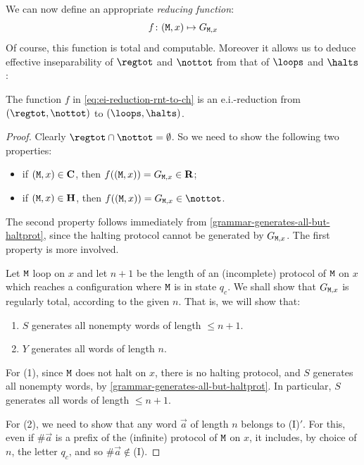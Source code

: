 \documentclass[runningheads]{amsart}
\newcommand{\TM}{\text{\rm\tt M}}
\begin{document}
We can now define an appropriate \emph{reducing function}:
\begin{equation}
\label{eq:ei-reduction-rnt-to-ch}
    f \colon (\TM,x) \mapsto G_{\TM,x}
\end{equation}
Of course, this function is total and computable.
Moreover it allows us to deduce effective inseparability of $\regtot $ and $\nottot$ from that of $\loops$ and $\halts$:



\begin{proposition}
\label{regtot-nottot-reduces-to-loops-halts}
    The function $f$ in \eqref{eq:ei-reduction-rnt-to-ch} is an e.i.-reduction from $(\regtot, \nottot)$ to $(\loops,\halts)$.
\end{proposition}
\begin{proof}
Clearly $\regtot \cap \nottot = \emptyset$. 
So we need to show the following two properties:
\begin{itemize}
\item if $(\TM,x) \in \mathbf{C}$, then $f((\TM,x)) = G_{\TM,x} \in \mathbf{R}$;
\item if $(\TM,x) \in \mathbf{H}$, then $f((\TM,x)) = G_{\TM,x} \in \nottot$.
\end{itemize}

The second property follows immediately from \cref{grammar-generates-all-but-haltprot}, since the halting protocol cannot be generated by $G_{\TM,x}$. The first property is more involved.

Let $\TM$ loop on $x$ and let $n+1$ be the length of an (incomplete) protocol of $\TM$ on $x$ which reaches a configuration where $\TM$ is in state $q_c$. We shall show that $G_{\TM,x}$ is regularly total, according to the given $n$.
That is, we will show that:
\begin{enumerate}
    \item $S$ generates all nonempty words of length $\leq n+1$.
    \item $Y$ generates all words of length $n$.
\end{enumerate}

For (1), since $\TM$ does not halt on $x$, there is no halting protocol, and $S$ generates all nonempty words, by \cref{grammar-generates-all-but-haltprot}. In particular, $S$ generates all words of length $\leq n + 1$.

For (2), we need to show that any word $\vec a$ of length $n$ belongs to (I)$'$.
For this, even if $\# \vec a$ is a prefix of the (infinite) protocol of $\TM$ on $x$, it includes, by choice of $n$, the letter $q_c$, and so $\# \vec a \notin $(I).
% 
% 
%
% 
\end{proof}
\end{document}
